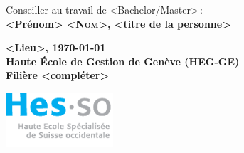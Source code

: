 \begin{titlepage}
\begin{center}
	

			\vspace{1cm}
      \vfill

			Conseiller au travail de <Bachelor/Master>\,:\\
				\textbf{\large{} <Prénom> \textsc{<Nom>}, <titre de la personne>}\\

			\vspace{2cm}
			\vfill		

			\textbf{\large <Lieu>, \today{}}\\
				\textbf{\large Haute École de Gestion de Genève (HEG-GE)}\\
				\textbf{\large Filière <compléter>}\\

		\end{center}

 		\vfill
		
			\begin{flushright}
		 		\includegraphics[width=4cm]{images/hes-logo.eps}
			\end{flushright}
  
	\end{titlepage}
\makeatother

\styleCenter		%
